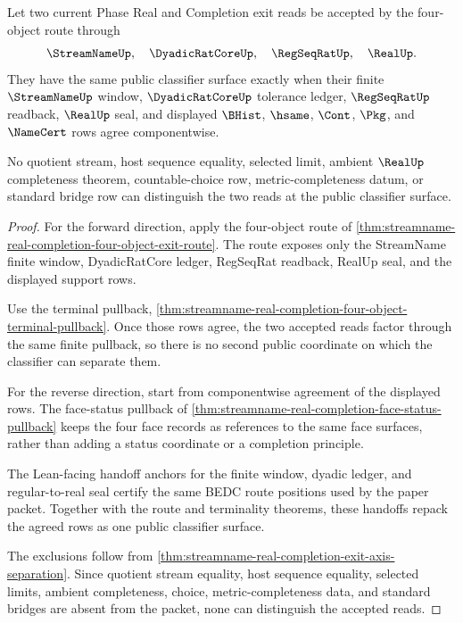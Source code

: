 \begin{theorem}
\label{thm:streamname-real-completion-classifier-pullback}
Let two current Phase Real and Completion exit reads be accepted by the four-object route through
$$
\StreamNameUp,\quad \DyadicRatCoreUp,\quad \RegSeqRatUp,\quad \RealUp.
$$
They have the same public classifier surface exactly when their finite $\StreamNameUp$ window, $\DyadicRatCoreUp$ tolerance ledger, $\RegSeqRatUp$ readback, $\RealUp$ seal, and displayed $\BHist$, $\hsame$, $\Cont$, $\Pkg$, and $\NameCert$ rows agree componentwise.

No quotient stream, host sequence equality, selected limit, ambient $\RealUp$ completeness theorem, countable-choice row, metric-completeness datum, or standard bridge row can distinguish the two reads at the public classifier surface.
\end{theorem}
\begin{proof}
For the forward direction, apply the four-object route of \autoref{thm:streamname-real-completion-four-object-exit-route}. The route exposes only the StreamName finite window, DyadicRatCore ledger, RegSeqRat readback, RealUp seal, and the displayed support rows.

Use the terminal pullback, \autoref{thm:streamname-real-completion-four-object-terminal-pullback}. Once those rows agree, the two accepted reads factor through the same finite pullback, so there is no second public coordinate on which the classifier can separate them.

For the reverse direction, start from componentwise agreement of the displayed rows. The face-status pullback of \autoref{thm:streamname-real-completion-face-status-pullback} keeps the four face records as references to the same face surfaces, rather than adding a status coordinate or a completion principle.

The Lean-facing handoff anchors for the finite window, dyadic ledger, and regular-to-real seal certify the same BEDC route positions used by the paper packet. Together with the route and terminality theorems, these handoffs repack the agreed rows as one public classifier surface.

The exclusions follow from \autoref{thm:streamname-real-completion-exit-axis-separation}. Since quotient stream equality, host sequence equality, selected limits, ambient completeness, choice, metric-completeness data, and standard bridges are absent from the packet, none can distinguish the accepted reads.
\end{proof}

